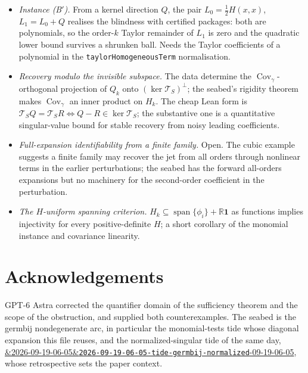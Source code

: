 \documentclass[11pt]{article}
\newcommand{\R}{\mathbb{R}}
\newcommand{\code}[1]{\texttt{#1}}
\newcommand{\Cov}{\operatorname{Cov}}
\newcommand{\tideref}[2][]{\href{https://therisensea.org/tides/#2/}{\ifx&#1&\texttt{#2}\else#1\fi}}
\begin{document}
\begin{itemize}
\item \emph{Instance (B$'$).} From a kernel direction $Q$, the pair
$L_0 = \tfrac12 H(x,x)$, $L_1 = L_0 + Q$ realises the blindness with
certified packages: both are polynomials, so the order-$k$ Taylor
remainder of $L_1$ is zero and the quadratic lower bound survives a
shrunken ball. Needs the Taylor coefficients of a polynomial in the
\code{taylorHomogeneousTerm} normalisation.
\item \emph{Recovery modulo the invisible subspace.} The data determine
the $\Cov_\gamma$-orthogonal projection of $Q_k$ onto $(\ker
\mathcal T_S)^\perp$; the seabed's rigidity theorem makes $\Cov_\gamma$
an inner product on $H_k$. The cheap Lean form is
$\mathcal T_S Q = \mathcal T_S R \iff Q - R \in \ker \mathcal T_S$; the
substantive one is a quantitative singular-value bound for stable
recovery from noisy leading coefficients.
\item \emph{Full-expansion identifiability from a finite family.} Open.
The cubic example suggests a finite family may recover the jet from all
orders through nonlinear terms in the earlier perturbations; the seabed
has the forward all-orders expansions but no machinery for the
second-order coefficient in the perturbation.
\item \emph{The $H$-uniform spanning criterion.} $H_k \subseteq
\operatorname{span}\{\phi_i\} + \R\mathbf 1$ as functions implies
injectivity for every positive-definite $H$; a short corollary of the
monomial instance and covariance linearity.
\end{itemize}

\section*{Acknowledgements}

GPT-6 Astra corrected the quantifier domain of the sufficiency theorem
and the scope of the obstruction, and supplied both counterexamples.
The seabed is the germbij nondegenerate arc, in particular the
monomial-tests tide whose diagonal expansion this file reuses, and the
normalized-singular tide of the same day,
\tideref[2026-09-19-06-05]{2026-09-19-06-05-tide-germbij-normalized},
whose retrospective sets the paper context.
\end{document}
